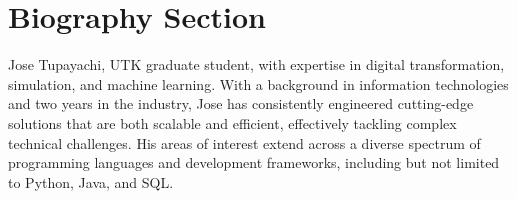 \documentclass[lettersize,journal]{IEEEtran}
\begin{document}







\newpage

\section{Biography Section}
 
\vspace{11pt}

\begin{IEEEbiography}{Jose Tupayachi}, UTK graduate student, with expertise  in digital transformation, simulation, and machine learning. With a background in information technologies and two years in the industry, Jose has consistently engineered cutting-edge solutions that are both scalable and efficient, effectively tackling complex technical challenges. His areas of interest extend across a diverse spectrum of programming languages and development frameworks, including but not limited to Python, Java, and SQL.
\end{IEEEbiography}
\end{document}
